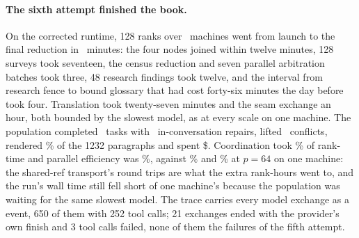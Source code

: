 \paragraph{The sixth attempt finished the book.} On the corrected runtime, 128
ranks over \eSevenMachinesOnetwentyeight\ machines went from launch to the final
reduction in \eSevenWallOnetwentyeight\ minutes: the four nodes joined within
twelve minutes, 128 surveys took seventeen, the census reduction and seven
parallel arbitration batches took three, 48 research findings took twelve, and
the interval from research fence to bound glossary that had cost forty-six
minutes the day before took four. Translation took twenty-seven minutes and the
seam exchange an hour, both bounded by the slowest model, as at every scale on one
machine. The population completed \eSevenTasksOnetwentyeight\ tasks with
\eSevenRepairsOnetwentyeight\ in-conversation repairs, lifted
\eSevenConflictsOnetwentyeight\ conflicts, rendered \eSevenCoverageOnetwentyeight\%
of the 1232 paragraphs and spent \$\eSevenCostOnetwentyeight. Coordination took
\eSevenCoordShareOnetwentyeight\% of rank-time and parallel efficiency was
\eSevenEfficiencyOnetwentyeight\%, against \eSevenCoordShareSixtyfour\% and
\eSevenEfficiencySixtyfour\% at $p=64$ on one machine: the shared-ref transport's
round trips are what the extra rank-hours went to, and the run's wall time still
fell short of one machine's because the population was waiting for the same
slowest model. The trace carries every model exchange as a 
event, 650 of them with 252 tool calls; 21 exchanges ended with the provider's
own  finish and 3 tool calls failed, none of them the failures of the
fifth attempt.

